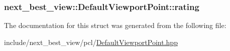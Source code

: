 \hypertarget{structnext__best__view_1_1DefaultViewportPoint_a5cae4fbc0960ef7e835c51c01801d25b}{
\subsubsection[{rating}]{ {\bf next\-\_\-best\-\_\-view\-::\-Default\-Viewport\-Point\-::rating}}}\label{structnext__best__view_1_1DefaultViewportPoint_a5cae4fbc0960ef7e835c51c01801d25b}


\-The documentation for this struct was generated from the following file\-:\begin{DoxyCompactItemize}
\item 
include/next\-\_\-best\-\_\-view/pcl/\hyperlink{DefaultViewportPoint_8hpp}{\-Default\-Viewport\-Point.\-hpp}\end{DoxyCompactItemize}
